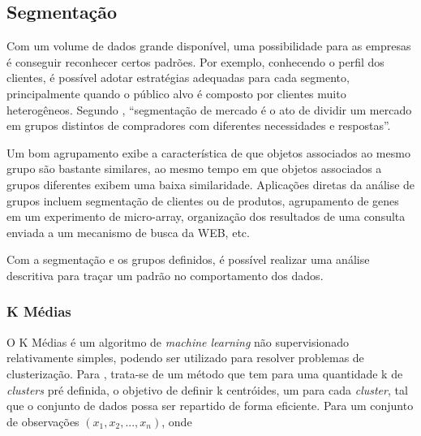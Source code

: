\subsection{Segmentação}


Com um volume de dados grande disponível, uma possibilidade para as empresas é conseguir reconhecer certos padrões. Por exemplo, conhecendo o perfil dos clientes, é possível adotar estratégias adequadas para cada segmento, principalmente quando o público alvo é composto por clientes muito heterogêneos. Segundo , ``segmentação de mercado é o ato de dividir um mercado em grupos distintos de compradores com diferentes necessidades e respostas''.

\begin{citacao} 
Um bom agrupamento exibe a característica de que objetos associados ao mesmo grupo são bastante similares, ao mesmo tempo em que objetos associados a grupos diferentes exibem uma baixa similaridade. Aplicações diretas da análise de grupos incluem segmentação de clientes ou de produtos, agrupamento de genes em um experimento de micro-array, organização dos resultados de uma consulta enviada a um mecanismo de busca da WEB, etc.
\cite{BEZERRA} \end{citacao}

Com a segmentação e os grupos definidos, é possível realizar uma análise descritiva para traçar um padrão no comportamento dos dados. 

\subsubsection{K Médias}

O K Médias é um algoritmo de \emph{machine learning} não supervisionado relativamente simples, podendo ser utilizado para resolver problemas de clusterização. Para , trata-se de um método que tem para uma quantidade k de \emph{clusters} pré definida, o objetivo de definir k centróides\footnotemark {}, um para cada \emph{cluster}, tal que o conjunto de dados possa ser repartido de forma eficiente. Para um conjunto de observações \begin{math}(x_{1}, x_{2}, ..., x_{n})\end{math}, onde 

